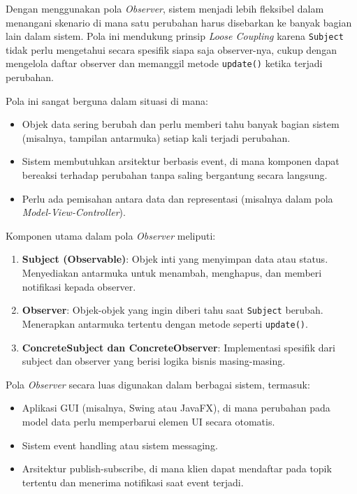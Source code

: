Dengan menggunakan pola \textit{Observer}, sistem menjadi lebih fleksibel dalam menangani skenario di mana satu perubahan harus disebarkan ke banyak bagian lain dalam sistem. Pola ini mendukung prinsip \textit{Loose Coupling} karena \texttt{Subject} tidak perlu mengetahui secara spesifik siapa saja observer-nya, cukup dengan mengelola daftar observer dan memanggil metode \texttt{update()} ketika terjadi perubahan.

Pola ini sangat berguna dalam situasi di mana:
\begin{itemize}
	\item Objek data sering berubah dan perlu memberi tahu banyak bagian sistem (misalnya, tampilan antarmuka) setiap kali terjadi perubahan.
	\item Sistem membutuhkan arsitektur berbasis event, di mana komponen dapat bereaksi terhadap perubahan tanpa saling bergantung secara langsung.
	\item Perlu ada pemisahan antara data dan representasi (misalnya dalam pola \textit{Model-View-Controller}).
\end{itemize}

Komponen utama dalam pola \textit{Observer} meliputi:
\begin{enumerate}
	\item \textbf{Subject (Observable)}: Objek inti yang menyimpan data atau status. Menyediakan antarmuka untuk menambah, menghapus, dan memberi notifikasi kepada observer.
	\item \textbf{Observer}: Objek-objek yang ingin diberi tahu saat \texttt{Subject} berubah. Menerapkan antarmuka tertentu dengan metode seperti \texttt{update()}.
	\item \textbf{ConcreteSubject dan ConcreteObserver}: Implementasi spesifik dari subject dan observer yang berisi logika bisnis masing-masing.
\end{enumerate}

Pola \textit{Observer} secara luas digunakan dalam berbagai sistem, termasuk:
\begin{itemize}
	\item Aplikasi GUI (misalnya, Swing atau JavaFX), di mana perubahan pada model data perlu memperbarui elemen UI secara otomatis.
	\item Sistem event handling atau sistem messaging.
	\item Arsitektur publish-subscribe, di mana klien dapat mendaftar pada topik tertentu dan menerima notifikasi saat event terjadi.
\end{itemize}


